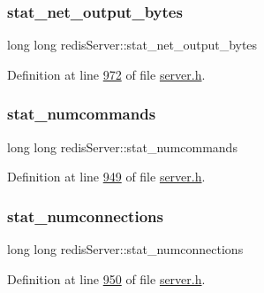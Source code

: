 \mbox{\label{structredisServer_acd268c3be8b16492a9a9c5867cb7f7eb}} 
\subsubsection{\texorpdfstring{stat\+\_\+net\+\_\+output\+\_\+bytes}{stat\_net\_output\_bytes}}
{\footnotesize\ttfamily long long redis\+Server\+::stat\+\_\+net\+\_\+output\+\_\+bytes}



Definition at line \hyperlink{server_8h_source_l00972}{972} of file \hyperlink{server_8h_source}{server.\+h}.

\mbox{\label{structredisServer_aacfd311465a094fbd7d1efe1397d0fa1}} 
\subsubsection{\texorpdfstring{stat\+\_\+numcommands}{stat\_numcommands}}
{\footnotesize\ttfamily long long redis\+Server\+::stat\+\_\+numcommands}



Definition at line \hyperlink{server_8h_source_l00949}{949} of file \hyperlink{server_8h_source}{server.\+h}.

\mbox{\label{structredisServer_adde54ade6ac662e89d0430e23f1a1082}} 
\subsubsection{\texorpdfstring{stat\+\_\+numconnections}{stat\_numconnections}}
{\footnotesize\ttfamily long long redis\+Server\+::stat\+\_\+numconnections}



Definition at line \hyperlink{server_8h_source_l00950}{950} of file \hyperlink{server_8h_source}{server.\+h}.

